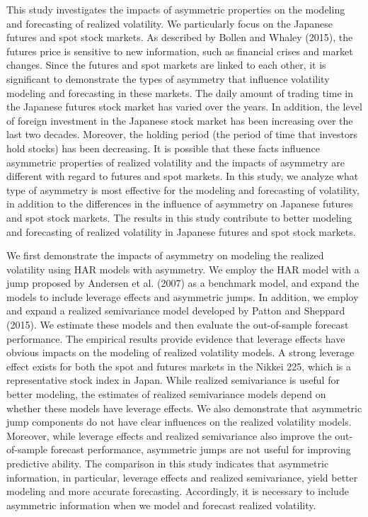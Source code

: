 \documentclass[10pt]{article}
\begin{document}
This study investigates the impacts of asymmetric properties on the modeling and forecasting of realized volatility. 
We particularly focus on the Japanese futures and spot stock markets. 
As described by Bollen and Whaley (2015), the futures price is sensitive to new information, such as financial crises and market changes. 
Since the futures and spot markets are linked to each other, 
it is significant to demonstrate the types of asymmetry that influence volatility modeling and forecasting in these markets. 
The daily amount of trading time in the Japanese futures stock market has varied over the years. 
In addition, the level of foreign investment in the Japanese stock market has been increasing over the last two decades. 
Moreover, the holding period (the period of time that investors hold stocks) has been decreasing.    
It is possible that these facts influence asymmetric properties of realized volatility and the impacts of asymmetry are different with regard to futures and spot markets. 
In this study, we analyze what type of asymmetry is most effective for the modeling and forecasting of volatility, in addition to the differences in the influence of asymmetry on Japanese futures and spot stock markets. 
The results in this study contribute to better modeling and forecasting of realized volatility in Japanese futures and spot stock markets. 

We first demonstrate the impacts of asymmetry on modeling the realized volatility using HAR models with asymmetry. 
We employ the HAR model with a jump proposed by Andersen et al. (2007) as a benchmark model, and expand the models to include leverage effects and asymmetric jumps. 
In addition, we employ and expand a realized semivariance model developed by Patton and Sheppard (2015). 
We estimate these models and then evaluate the out-of-sample forecast performance. 
The empirical results provide evidence that leverage effects have obvious impacts on the modeling of realized volatility models. 
A strong leverage effect exists for both the spot and futures markets in the Nikkei 225, which is a representative stock index in Japan. 
While realized semivariance is useful for better modeling,   
the estimates of realized semivariance models depend on whether these models have leverage effects. 
We also demonstrate that asymmetric jump components do not have clear influences on the realized volatility models.  
Moreover, while leverage effects and realized semivariance also improve the out-of-sample forecast performance,    
asymmetric jumps are not useful for improving predictive ability. 
The comparison in this study indicates that asymmetric information, in particular, leverage effects and realized semivariance, yield better modeling and more accurate forecasting. 
Accordingly, it is necessary to include asymmetric information when we model and forecast realized volatility. 
\end{document}
